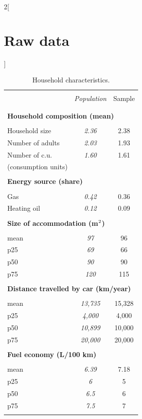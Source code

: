 \documentclass[12pt]{article} %
\begin{document}
\begin{appendices}
\begin{multicols}{2}[\section{Raw data\label{sec:Raw-Data}}]
\begin{minipage}[t]{.45\textwidth}
\vspace{-1cm}
\begin{table}[H]
    \caption{Household characteristics.\label{tab:app-energetic-characs}}
\centering
\begin{tabular}{lcc}
\hline \hline  \\[-1.8ex]
 & \emph{Population} & Sample  \tabularnewline \\[-1.8ex]
\hline  \\[-1.8ex]
\multicolumn{3}{l}{\textbf{Household composition (mean)}} \tabularnewline  \\[-1.8ex]
Household size & \emph{2.36} & 2.38\tabularnewline
Number of adults & \emph{2.03} & 1.93\tabularnewline
Number of c.u. & \emph{1.60} & 1.61\tabularnewline
(consumption units) &  & \tabularnewline
\hline   \\[-1.8ex]
\multicolumn{3}{l}{\textbf{Energy source (share)}} \tabularnewline  \\[-1.8ex]
Gas & \emph{0.42} & 0.36\tabularnewline
Heating oil & \emph{0.12} & 0.09\tabularnewline
\hline   \\[-1.8ex]
\multicolumn{3}{l}{\textbf{Size of accommodation (m$^\textnormal{2}$)}} \tabularnewline  \\[-1.8ex]
mean & \emph{97} & 96\tabularnewline
p25 & \emph{69} & 66\tabularnewline
p50 & \emph{90} & 90\tabularnewline
p75 & \emph{120} & 115\tabularnewline
\hline   \\[-1.8ex]
\multicolumn{3}{l}{\textbf{Distance travelled by car (km/year)}} \tabularnewline  \\[-1.8ex]
mean & \emph{13,735} & 15,328\tabularnewline
p25 & \emph{4,000} & 4,000\tabularnewline
p50 & \emph{10,899} & 10,000 \tabularnewline
p75 & \emph{20,000 } & 20,000 \tabularnewline
\hline   \\[-1.8ex]
\multicolumn{3}{l}{\textbf{Fuel economy (L/100 km)}} \tabularnewline  \\[-1.8ex]
mean & \emph{6.39} & 7.18\tabularnewline
p25 & \emph{6} & 5\tabularnewline
p50 & \emph{6.5} & 6\tabularnewline
p75 & \emph{7.5} & 7\tabularnewline  \\[-1.8ex]
\hline \hline 
\end{tabular}\bigskip{}


\end{table}
\end{minipage}
\end{multicols}
\end{appendices}
\end{document}
